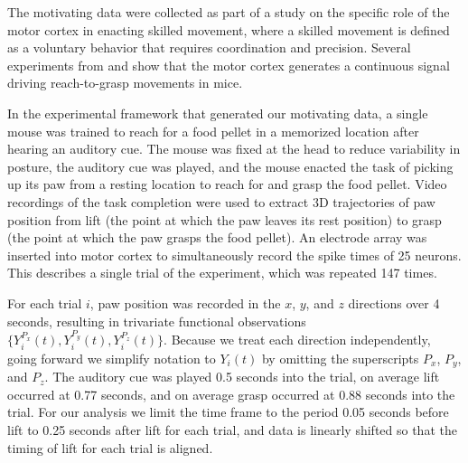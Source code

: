 \documentclass[preprint]{JASA}
\begin{document}
\label{sec:data}

The motivating data were collected as part of a study on the specific
role of the motor cortex in enacting skilled movement, where a skilled
movement is defined as a voluntary behavior that requires coordination
and precision. Several experiments from \cite{guo2015} and
\cite{sauerbrei2018} show that the motor cortex generates a continuous
signal driving reach-to-grasp movements in mice.

In the experimental framework that generated our motivating data, a
single mouse was trained to reach for a food pellet in a memorized
location after hearing an auditory cue. The mouse was fixed at the head
to reduce variability in posture, the auditory cue was played, and the
mouse enacted the task of picking up its paw from a resting location to
reach for and grasp the food pellet. Video recordings of the task
completion were used to extract 3D trajectories of paw position from
lift (the point at which the paw leaves its rest position) to grasp (the
point at which the paw grasps the food pellet). An electrode array was
inserted into motor cortex to simultaneously record the spike times of
25 neurons. This describes a single trial of the experiment, which was
repeated 147 times.

For each trial \(i\), paw position was recorded in the \(x\), \(y\), and
\(z\) directions over 4 seconds, resulting in trivariate functional
observations \(\{ Y_i^{P_x}(t), Y_i^{P_y}(t), Y_i^{P_z}(t)\}\). Because
we treat each direction independently, going forward we simplify
notation to \(Y_i(t)\) by omitting the superscripts \(P_x\), \(P_y\),
and \(P_z\). The auditory cue was played 0.5 seconds into the trial, on
average lift occurred at 0.77 seconds, and on average grasp occurred at
0.88 seconds into the trial. For our analysis we limit the time frame to
the period 0.05 seconds before lift to 0.25 seconds after lift for each
trial, and data is linearly shifted so that the timing of lift for each
trial is aligned.
\end{document}

